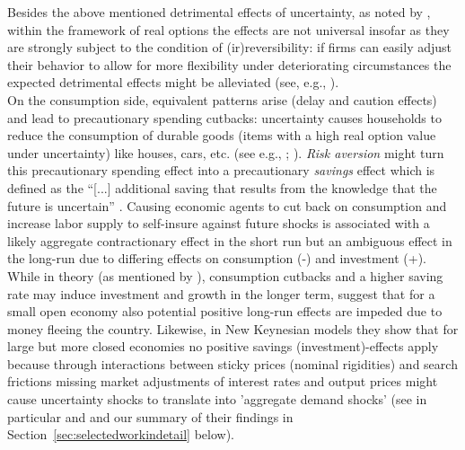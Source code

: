 \documentclass[a4paper,11pt,listof=nochaptergap,oneside,pointednumbers,bibtotoc,bigheadings,liststotoc,hidelinks]{scrbook}
\theoremstyle{mysatz}
\theoremstyle{mydefinition}
\theoremstyle{mytheorem}
\theoremstyle{mybemerkung}
\begin{document}
Besides the above mentioned detrimental effects of uncertainty, as noted by \citet{bloom:14}, within the framework of real options the effects are not universal insofar as they are strongly subject to the condition of (ir)reversibility: if firms can easily adjust their behavior to allow for more flexibility under deteriorating circumstances the expected detrimental effects might be alleviated (see, e.g., \citealp{vallettaandbengali:13}).\\

On the consumption side, equivalent patterns arise (delay and caution effects) and lead to precautionary spending cutbacks: uncertainty causes households to reduce the consumption of durable goods (items with a high real option value under uncertainty) like houses, cars, etc. (see e.g., \citealp{eberly:94}; \citealp{romer:90}). \textit{Risk aversion} might turn this precautionary spending effect into a precautionary \textit{savings} effect which is defined as the ``[...] additional saving that results from the knowledge that the future is uncertain'' \citep[p. 2]{carrollandkimball:06}. Causing economic agents to cut back on consumption and increase labor supply to self-insure against future shocks is associated with a likely aggregate contractionary effect in the short run but an ambiguous effect in the long-run due to differing effects on consumption (-) and investment (+). While in theory (as mentioned by \citealp{bloom:14}), consumption cutbacks and a higher saving rate may induce investment and growth in the longer term, \citet{villaverdeetal:11} suggest that for a small open economy also potential positive long-run effects are impeded due to money fleeing the country. Likewise, in New Keynesian models they show that for large but more closed economies no positive savings (investment)-effects apply because through interactions between sticky prices (nominal rigidities) and search frictions missing market adjustments of interest rates and output prices might cause uncertainty shocks to translate into 'aggregate demand shocks' (see in particular \citealp{leducandliu:16} and \citealp{basuandbundick:17} and our summary of their findings in Section~\ref{sec:selectedworkindetail} below).\\
\end{document}
